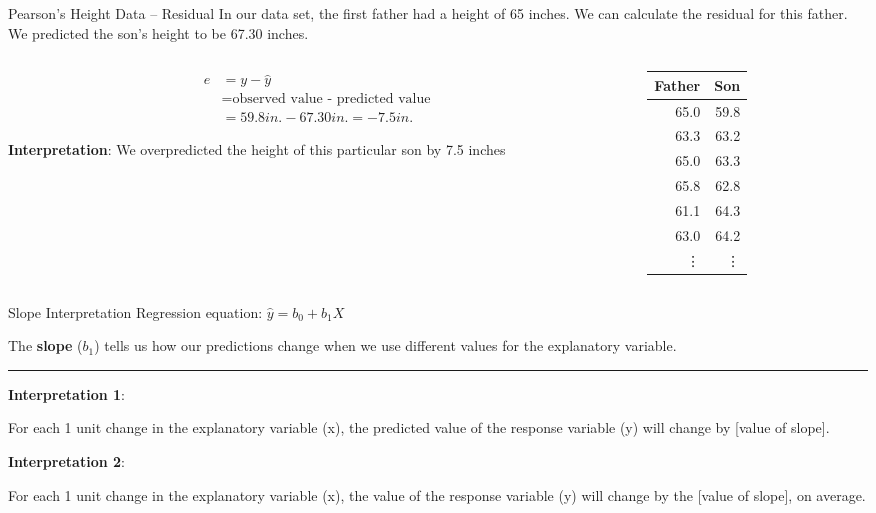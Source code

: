 \documentclass{beamer}
\begin{document}
\begin{frame}{Pearson's Height Data -- Residual}
In our data set, the first father had a height of 65 inches. We can calculate the residual for this father. We predicted the son's height to be 67.30 inches.
    \begin{columns}

  \begin{column}{0.5\textwidth}
\begin{align*}
    e & = y - \hat{y}\\
    & = \text{observed value - predicted value}\\
    & = 59.8in. - 67.30in. = -7.5 in.
\end{align*} \vspace{3mm}

\textbf{Interpretation}: We overpredicted the height of this particular son by 7.5 inches  
  \end{column}
  
  \begin{column}{0.3\textwidth}
\begin{center}
\begin{table}[ht]
\centering
\begin{tabular}{rr}
  \hline
Father & Son \\ 
  \hline
65.0 & 59.8 \\ 
  63.3 & 63.2 \\ 
  65.0 & 63.3 \\ 
  65.8 & 62.8 \\ 
  61.1 & 64.3 \\ 
  63.0 & 64.2 \\  
  \vdots & \vdots \\
   \hline
\end{tabular}
\end{table}
\end{center}
  \end{column}
\end{columns}
\end{frame}



\begin{frame}{Slope Interpretation}
Regression equation: $\hat{y} = b_0 + b_1X$ \vspace{2mm}

The \textbf{slope} ($b_1$) tells us how our predictions change when we use different values for the explanatory variable. \vspace{4mm}

\par\noindent\rule{\textwidth}{0.5pt}

\textbf{Interpretation 1}:

For each 1 unit change in the explanatory variable (x), the predicted value of the response variable (y) will change by [value of slope]. \vspace{3mm}

\textbf{Interpretation 2}:

For each 1 unit change in the explanatory variable (x), the value of the response variable (y) will change by the [value of slope], on average.

\end{frame}
\end{document}
